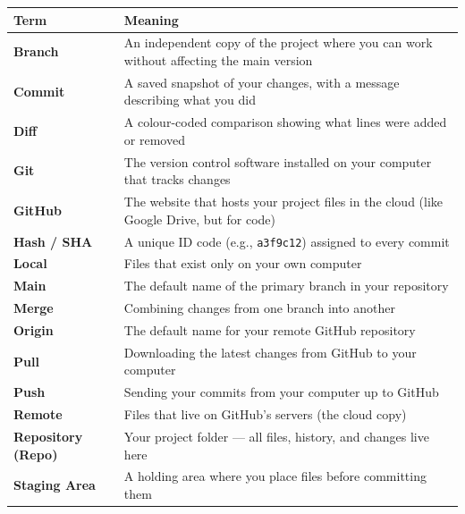 \documentclass[
]{article}
\begin{document}
\begin{longtable}[]{@{}
  >{\raggedright\arraybackslash}p{}
  >{\raggedright\arraybackslash}p{}@{}}
\toprule\noalign{}
\begin{minipage}[b]{\linewidth}\raggedright
Term
\end{minipage} & \begin{minipage}[b]{\linewidth}\raggedright
Meaning
\end{minipage} \\
\midrule\noalign{}
\endhead
\bottomrule\noalign{}
\endlastfoot
\textbf{Branch} & An independent copy of the project where you can work
without affecting the main version \\
\textbf{Commit} & A saved snapshot of your changes, with a message
describing what you did \\
\textbf{Diff} & A colour-coded comparison showing what lines were added
or removed \\
\textbf{Git} & The version control software installed on your computer
that tracks changes \\
\textbf{GitHub} & The website that hosts your project files in the cloud
(like Google Drive, but for code) \\
\textbf{Hash / SHA} & A unique ID code (e.g., \texttt{a3f9c12}) assigned
to every commit \\
\textbf{Local} & Files that exist only on your own computer \\
\textbf{Main} & The default name of the primary branch in your
repository \\
\textbf{Merge} & Combining changes from one branch into another \\
\textbf{Origin} & The default name for your remote GitHub repository \\
\textbf{Pull} & Downloading the latest changes from GitHub to your
computer \\
\textbf{Push} & Sending your commits from your computer up to GitHub \\
\textbf{Remote} & Files that live on GitHub's servers (the cloud
copy) \\
\textbf{Repository (Repo)} & Your project folder --- all files, history,
and changes live here \\
\textbf{Staging Area} & A holding area where you place files before
committing them \\
\end{longtable}
\end{document}
